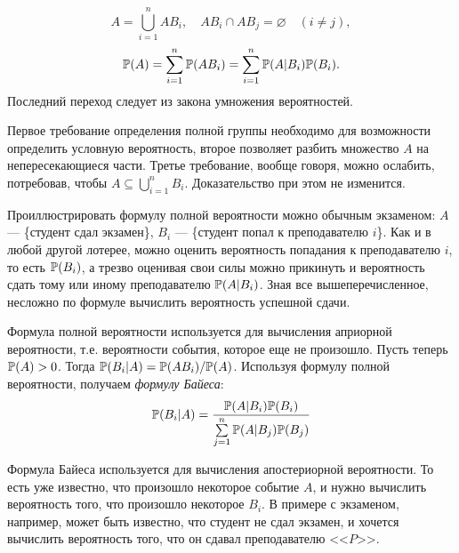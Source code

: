 \documentclass[../TV&MS.tex]{subfiles}
\begin{document}
\begin{Proof}
$$A=\bigcup\limits_{i=1}^{n}AB_i, \quad AB_i \cap AB_j = \varnothing \quad (i \not= j),$$
$$\mathbb{P}(A) = \sum\limits_{i=1}^n \mathbb{P}(AB_i) = \sum\limits_{i=1}^{n} \mathbb{P}(A|B_i)\mathbb{P}(B_i).$$
Последний переход следует из  закона умножения вероятностей.
\end{Proof}

Первое требование определения полной группы необходимо для возможности определить 
условную вероятность, второе позволяет разбить множество $A$ на непересекающиеся части. 
Третье требование, вообще говоря, можно ослабить, потребовав, чтобы 
$A \subseteq \bigcup\limits_{i=1}^nB_i$. Доказательство при этом не изменится. \\

\begin{Ex}
Проиллюстрировать формулу полной вероятности можно обычным экзаменом: $A$ --- \{студент сдал экзамен\}, 
$B_i$ --- \{студент попал к преподавателю $i$\}. Как и в любой другой лотерее, можно оценить вероятность 
попадания к преподавателю $i$, то есть $\mathbb{P}(B_i)$, а трезво оценивая свои силы можно прикинуть 
и вероятность сдать тому или иному преподавателю $\mathbb{P}(A|B_i)$. Зная все вышеперечисленное, 
несложно по формуле вычислить вероятность успешной сдачи.
\end{Ex}

Формула полной вероятности используется для вычисления априорной вероятности, т.е. вероятности 
события, которое  еще не произошло. Пусть теперь $\mathbb{P}(A) > 0$. Тогда 
$\mathbb{P}(B_i|A)=\mathbb{P}(AB_i)/\mathbb{P}(A)$. Используя формулу полной вероятности, 
получаем \emph{формулу Байеса}:
$$\mathbb{P}(B_i|A)=\frac{\mathbb{P}(A|B_i)\mathbb{P}(B_i)}{\sum\limits_{j=1}^n\mathbb{P}(A|B_j)\mathbb{P}(B_j)}$$

Формула Байеса используется для вычисления апостериорной вероятности. То есть уже известно, что произошло некоторое событие $A$, и нужно вычислить вероятность
того, что произошло некоторое $B_i$. В примере с экзаменом, например, может быть известно, что студент не сдал экзамен, и хочется вычислить вероятность того, что он
сдавал преподавателю <<$P$>>.

\newpage
\end{document}
